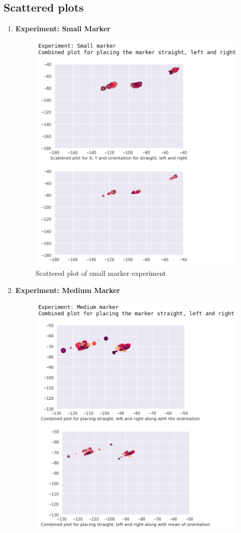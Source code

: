 \documentclass[11pt,a4paper]{article}
\begin{document}
				\subsection{Scattered plots}
				\begin{enumerate}
				\item \textbf{Experiment: Small Marker}
				\begin{figure}[H]
					\centering
					\includegraphics[scale=0.7]{small}	
					\caption{Scattered plot of small marker experiment}
				\end{figure}
				\newpage
				\item \textbf{Experiment: Medium Marker}
				\begin{figure}[H]
					\centering
					\includegraphics[scale=0.7]{medium}	

\end{figure}
\end{enumerate}
\end{document}
